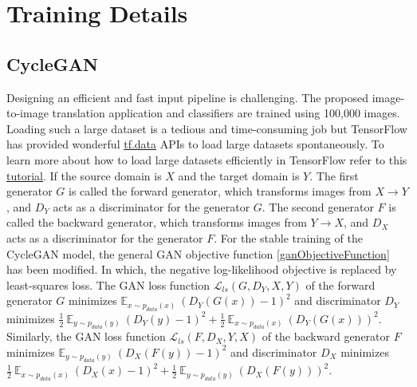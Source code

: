 \section{Training Details}\label{TrainingDetails}




\subsection{CycleGAN}\label{TrainingDetailsCycleGAN}
Designing an efficient and fast input pipeline is challenging. The proposed image-to-image translation application and classifiers are trained using 100,000 images. Loading such a large dataset is a tedious and time-consuming job but TensorFlow has provided wonderful \href{https://www.tensorflow.org/guide/data}{tf.data} APIs to load large datasets spontaneously. To learn more about how to load large datasets efficiently in TensorFlow refer to this \href{https://www.tensorflow.org/tutorials/load_data/images}{tutorial}. If the source domain is $X$ and the target domain is $Y$. The first generator $G$ is called the forward generator, which transforms images from $X \rightarrow Y$, and $D_Y$ acts as a discriminator for the generator $G$. The second generator $F$ is called the backward generator, which transforms images from $Y \rightarrow X$, and $D_X$ acts as a discriminator for the generator $F$. For the stable training of the \ac{CycleGAN} model, the general \ac{GAN} objective function \ref{ganObjectiveFunction} has been modified. In which, the negative log-likelihood objective is replaced by least-squares loss\cite{mao2017squares}. The \ac{GAN} loss function $\mathcal{L}_{ls}(G, D_Y, X, Y)$ of the forward generator $G$ minimizes $\mathbb{E}_{x \sim p_{data}(x)}\ (D_Y(G(x)) - 1)^2$ and discriminator $D_Y$ minimizes $\frac{1}{2}\ \mathbb{E}_{y \sim p_{data}(y)}\ (D_Y(y) - 1)^2 + \frac{1}{2}\ \mathbb{E}_{x \sim p_{data}(x)}\ (D_Y(G(x)))^2$. Similarly, the \ac{GAN} loss function $\mathcal{L}_{ls}(F, D_X, Y, X)$ of the backward generator $F$ minimizes $\mathbb{E}_{y \sim p_{data}(y)}\ (D_X(F(y)) - 1)^2$ and discriminator $D_X$ minimizes $\frac{1}{2}\ \mathbb{E}_{x \sim p_{data}(x)}\ (D_X(x) - 1)^2 + \frac{1}{2}\ \mathbb{E}_{y \sim p_{data}(y)}\ (D_X(F(y)))^2$.

